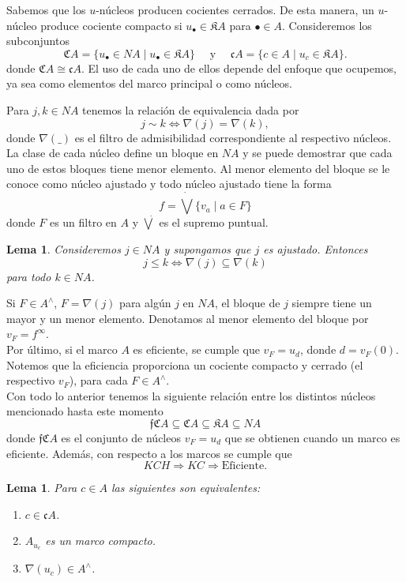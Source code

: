 \documentclass[11pt]{amsart}
\theoremstyle{plain}
\newtheorem{lem}[thm]{Lema}
\theoremstyle{definition}
\begin{document}
Sabemos que los $u$-núcleos producen cocientes cerrados. De esta manera, un $u$-núcleo produce cociente compacto si $u_{\bullet}\in \mathfrak{K}A$ para $\bullet\in A$. Consideremos los subconjuntos
\[
\mathfrak{C}A=\{u_\bullet\in NA\mid u_\bullet\in \mathfrak{K}A\}\quad \mbox{ y }\quad \mathfrak{c}A=\{c\in A\mid u_c\in \mathfrak{K}A\}.
\]
donde $\mathfrak{C}A\cong \mathfrak{c}A$. El uso de cada uno de ellos depende del enfoque que ocupemos, ya sea como elementos del marco principal o como núcleos.

Para $j, k\in NA$ tenemos la relación de equivalencia dada por 
\[
j\sim k \Leftrightarrow \nabla(j)=\nabla(k),
\]
donde $\nabla( \_ )$ es el filtro de admisibilidad correspondiente al respectivo núcleos.\\

La clase de cada núcleo define un bloque en $NA$ y se puede demostrar que cada uno de estos bloques tiene menor elemento. Al menor elemento del bloque se le conoce como núcleo ajustado y todo núcleo ajustado tiene la forma
\[
f=\dot\bigvee \{v_a\mid a\in F\}
\]
donde $F$ es un filtro en $A$ y $\dot{\bigvee}$ es el supremo puntual.

\begin{lem}\label{cn ajustado}
    Consideremos $j\in NA$ y supongamos que $j$ es ajustado. Entonces
    \[
    j\leq k\Leftrightarrow \nabla(j)\subseteq \nabla(k)
    \]
    para todo $k\in NA$.
\end{lem}

Si $F\in A^\wedge$, $F=\nabla(j)$ para algún $j$ en $NA$, el bloque de $j$ siempre tiene un mayor y un menor elemento. Denotamos al menor elemento del bloque por  $v_F=f^\infty$.\\

Por último, si el marco $A$ es eficiente, se cumple que $v_F=u_d$, donde $d=v_F(0)$. Notemos que la eficiencia proporciona un cociente compacto y cerrado (el respectivo $v_F$), 
para cada $F\in A^\wedge$.\\

Con todo lo anterior tenemos la siguiente relación entre los distintos núcleos mencionado hasta este momento
\[
\mathfrak{f}\mathfrak{C}A\subseteq \mathfrak{C}A\subseteq \mathfrak{K}A\subseteq NA
\]
donde $\mathfrak{f}\mathfrak{C}A$ es el conjunto de núcleos $v_F=u_d$ que se obtienen cuando un marco es eficiente. Además, con respecto a los marcos se cumple que
\[
KCH\Rightarrow KC\Rightarrow \mbox{Eficiente}.
\]

\begin{lem}\label{Lema2.2}
    Para $c\in A$ las siguientes son equivalentes:
    \begin{enumerate}
        \item $c\in \mathfrak{c}A$.
        \item $A_{u_c}$ es un marco compacto.
        \item $\nabla(u_c)\in A^\wedge$.
    \end{enumerate}
\end{lem}
\end{document}
